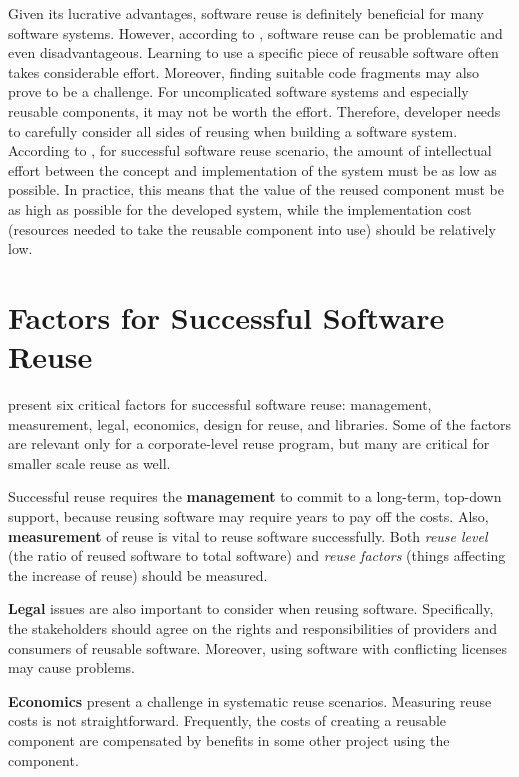 Given its lucrative advantages, software reuse is definitely beneficial for many software systems. However, according to \citet{krueger_software_1992}, software reuse can be problematic and even disadvantageous. Learning to use a specific piece of reusable software often takes considerable effort. Moreover, finding suitable code fragments may also prove to be a challenge. For uncomplicated software systems and especially reusable components, it may not be worth the effort. Therefore, developer needs to carefully consider all sides of reusing when building a software system. According to \citet[chap.~1.3]{krueger_software_1992}, for successful software reuse scenario, the amount of intellectual effort between the concept and implementation of the system must be as low as possible. In practice, this means that the value of the reused component must be as high as possible for the developed system, while the implementation cost (resources needed to take the reusable component into use) should be relatively low. 

\section{Factors for Successful Software Reuse}
\label{section:successfullreusefactors}
\citet{frakes_success_1994} present six critical factors for successful software reuse: management, measurement, legal, economics, design for reuse, and libraries. Some of the factors are relevant only for a corporate-level reuse program, but many are critical for smaller scale reuse as well.

Successful reuse requires the \textbf{management} to commit to a long-term, top-down support, because reusing software may require years to pay off the costs. Also, \textbf{measurement} of reuse is vital to reuse software successfully. Both \emph{reuse level} (the ratio of reused software to total software) and \emph{reuse factors} (things affecting the increase of reuse) should be measured.

\textbf{Legal} issues are also important to consider when reusing software. Specifically, the stakeholders should agree on the rights and responsibilities of providers and consumers of reusable software. Moreover, using software with conflicting licenses may cause problems.

\textbf{Economics} present a challenge in systematic reuse scenarios. Measuring reuse costs is not straightforward. Frequently, the costs of creating a reusable component are compensated by benefits in some other project using the component.


